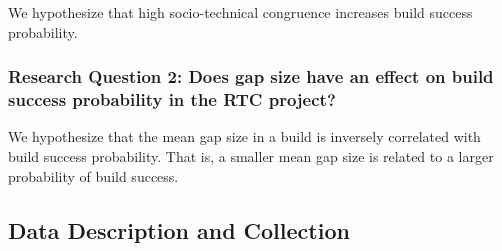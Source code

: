 \documentclass[12pt,oneside]{book}
\begin{document}
We hypothesize that high socio-technical congruence increases build success probability.

\subsubsection*{Research Question 2: Does gap size have an effect on build success probability in the RTC project?}

We hypothesize that the mean gap size in a build is inversely correlated with build success probability. That is, a smaller mean gap size is related to a larger probability of build success.

\subsection{Data Description and Collection}
\label{sec:data}
\end{document}
